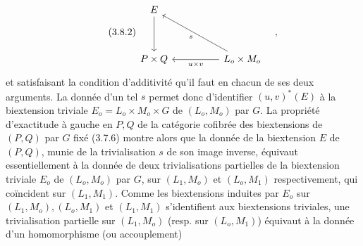 \begin{equation}\tag{3.8.2}
\begin{tikzcd}[column sep=huge, row sep=huge]
E \arrow[d] & \\
P \times Q & L_o \times M_o \arrow[l, "u \times v"] \arrow[ul, "s"]
\end{tikzcd}\quad ,
\end{equation}
et satisfaisant la condition d'additivité qu'il faut en chacun de ses deux arguments. La donnée d'un tel $s$ permet donc d'identifier $(u,v)^{*}(E)$ à la biextension triviale $E_o = L_o \times M_o \times G$ de $(L_o,M_o)$ par $G$. La propriété d'exactitude à gauche en $P,Q$ de la catégorie cofibrée des biextensions de $(P,Q)$ par $G$ fixé (3.7.6) montre alors que la donnée de la biextension $E$ de $(P,Q)$, munie de la trivialisation $s$ de son image inverse, équivaut essentiellement à la donnée de deux trivialisations partielles de la biextension triviale $E_o$ de $(L_o,M_o)$ par $G$, sur $(L_1,M_o)$ et $(L_o,M_1)$ respectivement, qui coïncident sur $(L_1,M_1)$. Comme les biextensions induites par $E_o$ sur $(L_1,M_o),(L_o,M_1)$ et $(L_1,M_1)$ s'identifient aux biextensions triviales, une trivialisation partielle sur $(L_1,M_o)$ (resp. sur $(L_o,M_1)$) équivaut à la donnée d'un homomorphisme (ou accouplement)

